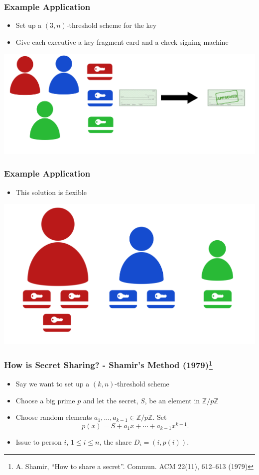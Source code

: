 \documentclass{beamer}
\newcommand{\integers}{\mathbb{Z}}
\begin{document}
\begin{frame}
	\frametitle{Example Application}
	\begin{itemize}
		\item Set up a $(3,n)$-threshold scheme for the key\pause
		\item Give each executive a key fragment card and a check signing machine\pause
	\end{itemize}
	\vspace{1cm}
	\centering
	\includegraphics[scale=.33]{three_execs.png}
\end{frame}

\begin{frame}
	\frametitle{Example Application}
	\begin{itemize}
		\item This solution is flexible\pause
	\end{itemize}
	\vspace{1cm}
	\centering
	\includegraphics[scale=.2]{exec_levels.png}
\end{frame}

\begin{frame}
	\frametitle{How is Secret Sharing? - Shamir's Method (1979)\footnote{A. Shamir, ``How to share a secret''. Commun. ACM 22(11), 612–613 (1979)}}
	\begin{itemize}
		\item Say we want to set up a $(k,n)$-threshold scheme\pause
		\item Choose a big prime $p$ and let the secret, $S$, be an element in $\integers/p\integers$\pause
		\item Choose random elements $a_1, \ldots, a_{k-1}\in \integers/p\integers$. Set
		\[
		p(x) = S + a_1x + \cdots + a_{k-1}x^{k-1}.
		\]\pause
		\item Issue to person $i$, $1\leq i\leq n$, the share $D_i = (i, p(i))$.
	\end{itemize}
\end{frame}
\end{document}
